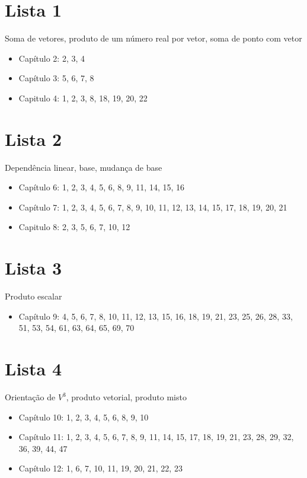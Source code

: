 \documentclass[brazilian, fleqn]{article}
\begin{document}
\section{Lista 1}
Soma de vetores, produto de um número real por vetor, soma de ponto com vetor
\begin{itemize}
    \item Capítulo 2: 2, 3, 4
    \item Capítulo 3: 5, 6, 7, 8
    \item Capitulo 4: 1, 2, 3, 8, 18, 19, 20, 22
\end{itemize}

\section{Lista 2}
Dependência linear, base, mudança de base
\begin{itemize}
    \item Capítulo 6: 1, 2, 3, 4, 5, 6, 8, 9, 11, 14, 15, 16
    \item Capítulo 7: 1, 2, 3, 4, 5, 6, 7, 8, 9, 10, 11, 12, 13, 14, 15, 17, 18, 19, 20, 21
    \item Capitulo 8: 2, 3, 5, 6, 7, 10, 12
\end{itemize}

\section{Lista 3}
Produto escalar
\begin{itemize}
    \item Capítulo 9: 4, 5, 6, 7, 8, 10, 11, 12, 13, 15, 16, 18, 19, 21, 23, 25, 26, 28, 33, 51, 53, 54, 61, 63, 64, 65, 69, 70
\end{itemize}

\section{Lista 4}
Orientação de \(V^3\), produto vetorial, produto misto
\begin{itemize}
    \item Capítulo 10: 1, 2, 3, 4, 5, 6, 8, 9, 10
    \item Capítulo 11: 1, 2, 3, 4, 5, 6, 7, 8, 9, 11, 14, 15, 17, 18, 19, 21, 23, 28, 29, 32, 36, 39, 44, 47
    \item Capítulo 12: 1, 6, 7, 10, 11, 19, 20, 21, 22, 23
\end{itemize}
\end{document}
